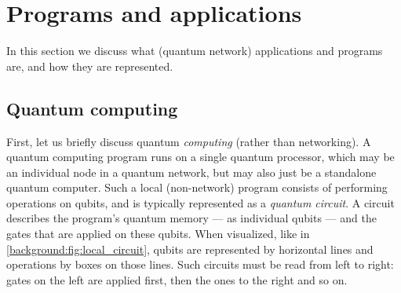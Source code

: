 



\section{Programs and applications}
\label{background:sec:applications}

In this section we discuss what (quantum network) applications and programs are, and how they are represented.

\subsection{Quantum computing}
First, let us briefly discuss quantum \emph{computing} (rather than networking).
A quantum computing program runs on a single quantum processor, which may be an individual node in a quantum network, but may also just be a standalone quantum computer.
Such a local (non-network) program consists of performing operations on qubits, and is typically represented as a \emph{quantum circuit}.
A circuit describes the program's quantum memory --- as individual qubits --- and the gates that are applied on these qubits.
When visualized, like in \cref{background:fig:local_circuit}, qubits are represented by horizontal lines and operations by boxes on those lines.
Such circuits must be read from left to right: gates on the left are applied first, then the ones to the right and so on.

